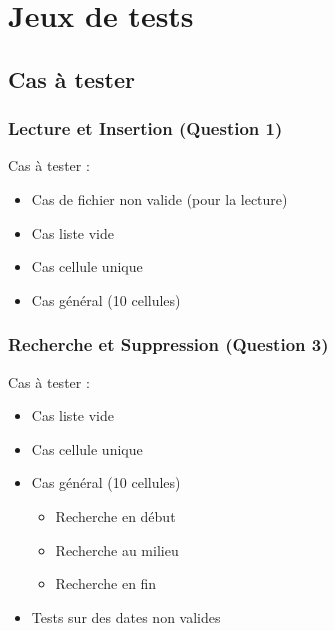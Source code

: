 \documentclass{report}
\newenvironment{myindentpar}[1]%
    {\begin{list}{}%
             {\setlength{\leftmargin}{#1}}%
             \item[]%
     }
     {\end{list}}
\begin{document}
\newpage
\section{Jeux de tests}
\subsection{Cas à tester}
\subsubsection{Lecture et Insertion (Question 1)}
Cas à tester :
\begin{myindentpar}{2cm}
\begin{itemize}
    \item Cas de fichier non valide (pour la lecture)
    \item Cas liste vide
    \item Cas cellule unique
    \item Cas général (10 cellules)
\end{itemize}
\end{myindentpar}

\subsubsection{Recherche et Suppression (Question 3)}
Cas à tester :
\begin{myindentpar}{2cm}
\begin{itemize}
    \item Cas liste vide
    \item Cas cellule unique
    \item Cas général (10 cellules)
    \begin{itemize}
        \item Recherche en début
        \item Recherche au milieu
        \item Recherche en fin
    \end{itemize}
    \item Tests sur des dates non valides
\end{itemize}
\end{myindentpar}
\end{document}
